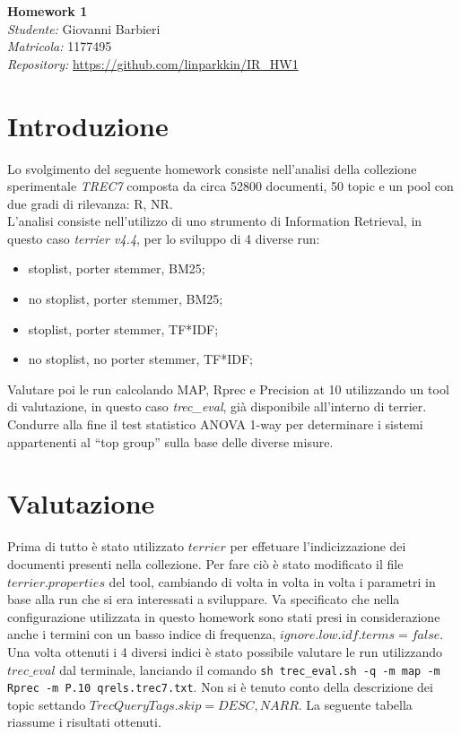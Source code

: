 \documentclass[a4paper, 11pt]{article}
\begin{document}
\noindent
\large\textbf{Homework 1} \\
\normalsize \textit{Studente:} Giovanni Barbieri\\
\textit{Matricola:} 1177495\\
\textit{Repository:} \url{https://github.com/linparkkin/IR_HW1}


\section*{Introduzione}
Lo svolgimento del seguente homework consiste nell'analisi della collezione sperimentale \textit{TREC7} composta da circa 52800 documenti, 50 topic e un pool con due gradi di rilevanza: R, NR. \\
L'analisi consiste nell'utilizzo di uno strumento di Information Retrieval, in questo caso \textit{terrier v4.4}, per lo sviluppo di 4 diverse run: 
\begin{itemize}
 \item stoplist, porter stemmer, BM25;
 \item no stoplist, porter stemmer, BM25;
 \item stoplist, porter stemmer, TF*IDF;
 \item no stoplist, no porter stemmer, TF*IDF;
\end{itemize}
Valutare poi le run calcolando MAP, Rprec e Precision at 10 utilizzando un tool di valutazione, in questo caso \textit{trec\_eval}, già disponibile all'interno di terrier. \\
Condurre alla fine il test statistico  ANOVA 1-way per determinare i sistemi appartenenti al ``top group'' sulla base delle diverse misure. 

\section*{Valutazione}
Prima di tutto è stato utilizzato $terrier$ per effetuare l'indicizzazione dei documenti presenti nella collezione. Per fare ciò è stato modificato il file $terrier.properties$ del tool, cambiando di volta in volta in volta i parametri in base alla run che si era interessati a sviluppare. Va specificato che nella configurazione utilizzata in questo homework sono stati presi in considerazione anche i termini con un basso indice di frequenza, $ignore.low.idf.terms=false$. \\
Una volta ottenuti i 4 diversi indici è stato possibile valutare le run utilizzando $trec\_eval$ dal terminale, lanciando il comando \texttt{sh trec\_eval.sh -q -m map -m Rprec -m P.10 qrels.trec7.txt}. Non si è tenuto conto della descrizione dei topic settando $TrecQueryTags.skip=DESC,NARR$.
La seguente tabella riassume i risultati ottenuti.
\end{document}
